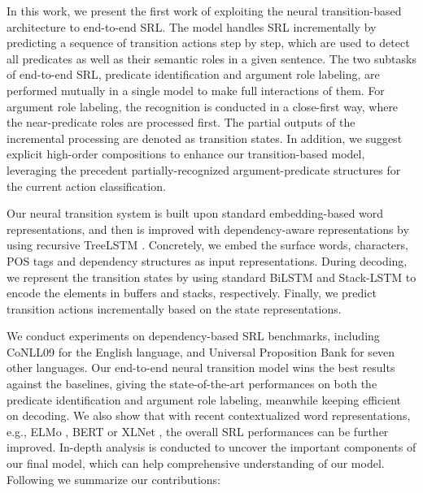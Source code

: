 \documentclass[letterpaper]{article} \usepackage{aaai21}  \usepackage{times}  \usepackage{helvet} \usepackage{courier}  \usepackage[hyphens]{url}  \usepackage{graphicx} \urlstyle{rm} \def\UrlFont{\rm}  \usepackage{natbib}  \usepackage{caption}
\begin{document}
\begin{CJK}{UTF8}{gbsn}
In this work, we present the first work of exploiting the neural transition-based architecture to end-to-end SRL.
The model handles SRL incrementally by predicting a sequence of transition actions step by step,
which are used to detect all predicates as well as their semantic roles in a given sentence.
The two subtasks of end-to-end SRL, predicate identification and argument role labeling, are performed mutually in a single model to make full interactions of them.
For argument role labeling, the recognition is conducted in a close-first way,
where the near-predicate roles are processed first.
The partial outputs of the incremental processing are denoted as transition states.
In addition, we suggest explicit high-order compositions to enhance our transition-based model,
leveraging the precedent partially-recognized argument-predicate structures for the current action classification.






Our neural transition system is built upon standard embedding-based word representations,
and then is improved with dependency-aware representations by using recursive TreeLSTM \cite{tai-etal-2015-improved}.
Concretely, we embed the surface words, characters, POS tags and dependency structures as input representations.
During decoding, we represent the transition states by using standard BiLSTM \cite{hochreiter1997long} and Stack-LSTM \cite{dyer-etal-2015-transition} to encode the elements in buffers and stacks, respectively.
Finally, we predict transition actions incrementally based on the state representations.



We conduct experiments on dependency-based SRL benchmarks, including CoNLL09 \cite{hajic-etal-2009-conll} for the English language, and Universal Proposition Bank \cite{akbik2015generating,akbik2016polyglot} for seven other languages.
Our end-to-end neural transition model wins the best results against the baselines, giving the state-of-the-art performances on both the predicate identification and argument role labeling, meanwhile keeping efficient on decoding.
We also show that with recent contextualized word representations, e.g., ELMo \cite{devlin-etal-2019-bert}, BERT \cite{PetersNIGCLZ18} or XLNet \cite{YangDYCSL19},
the overall SRL performances can be further improved.
In-depth analysis is conducted to uncover the important components of our final model,
which can help comprehensive understanding of our model.
Following we summarize our contributions:


\end{CJK}
\end{document}
